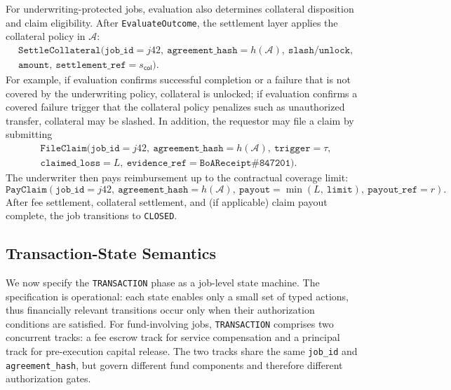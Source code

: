 \documentclass{article} %
\begin{document}
For underwriting-protected jobs, evaluation also determines collateral disposition and claim eligibility. After \texttt{EvaluateOutcome}, the settlement layer applies the collateral policy in $\mathcal{A}$:
\[
\begin{aligned}
&\texttt{SettleCollateral}(\texttt{job\_id}=j42,\ \texttt{agreement\_hash}=h(\mathcal{A}),\ \texttt{slash/unlock},\\ &\texttt{amount},\ \texttt{settlement\_ref}=s_{\textsf{col}}).
\end{aligned}
\]
For example, if evaluation confirms successful completion or a failure that is not covered by the underwriting policy, collateral is unlocked; if evaluation confirms a covered failure trigger that the collateral policy penalizes such as unauthorized transfer, collateral may be slashed. In addition, the requestor may file a claim by submitting
\[
\begin{aligned}
&\texttt{FileClaim}(\texttt{job\_id}=j42,\ \texttt{agreement\_hash}=h(\mathcal{A}),\ \texttt{trigger}=\tau,\\ &\texttt{claimed\_loss}=L,\ \texttt{evidence\_ref}=\texttt{BoAReceipt\#847201}).
\end{aligned}
\]
The underwriter then pays reimbursement up to the contractual coverage limit:
\[
\texttt{PayClaim}(\texttt{job\_id}=j42,\ \texttt{agreement\_hash}=h(\mathcal{A}),\ \texttt{payout}=\min(L,\ \texttt{limit}),\ \texttt{payout\_ref}=r).
\]
After fee settlement, collateral settlement, and (if applicable) claim payout complete, the job transitions to \texttt{CLOSED}. 





\subsection{Transaction-State Semantics}
We now specify the \texttt{TRANSACTION} phase as a job-level state machine. The specification is operational: each state enables only a small set of typed actions, thus financially relevant transitions occur only when their authorization conditions are satisfied. For fund-involving jobs, \texttt{TRANSACTION} comprises two concurrent tracks: a fee escrow track for service compensation and a principal track for pre-execution capital release. The two tracks share the same \texttt{job\_id} and \texttt{agreement\_hash}, but govern different fund components and therefore different authorization gates.
\end{document}

